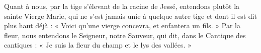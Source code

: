 Quant à nous, par la tige s’élevant de la racine de Jessé, entendons plutôt la sainte Vierge Marie, qui ne s’est jamais unie à quelque autre tige et dont il est dit plus haut déjà : « Voici qu’une vierge concevra, et enfantera un fils. » Par la fleur, nous entendons le Seigneur, notre Sauveur, qui dit, dans le Cantique des cantiques : « Je suis la fleur du champ et le lys des vallées. »